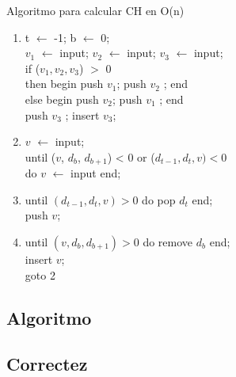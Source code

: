 \documentclass[aspectratio=169,xcolor=dvipsnames, t]{beamer}
\begin{document}
\begin{frame}{Algoritmo para calcular CH en O(n)}
    \begin{center}
        \begin{enumerate}
        \footnotesize
            \item t $\leftarrow$ -1; b $\leftarrow$ 0;\\
                $v_{1}$ $\leftarrow$ input; $v_{2}$ $\leftarrow$ input; $v_{3}$ $\leftarrow$ input;\\
                 if ($v_{1}, v_{2}, v_{3}$) $>$ 0\\
                \hspace*{0.5cm} then begin push $v_{1}$; push $v_{2}$ ; end \\
                \hspace*{0.5cm} else begin push $v_{2}$; push $v_{1}$ ; end \\
                push $v_{3}$ ; insert $v_{3}$; 
            \item $v$ $\leftarrow$ input;\\
                until ($v$, $d_{b}$, $d_{b+1}$) < 0 or ($d_{t-1}, d_{t}, v) < 0$ \\
                \hspace*{0.5cm} do $v$ $\leftarrow$ input end;  
            \item until $(d_{t-1}, d_{t}, v) > 0$ do pop $d_{t}$ end;\\
                push $v$;
            \item until $(v, d_{b}, d_{b+1}) > 0$ do remove $d_{b}$ end;\\ 
                insert $v$; \\
                goto 2\\
        \end{enumerate}
    \end{center}
\end{frame}

\subsection{Algoritmo}
\subsection{Correctez}

\end{document}
